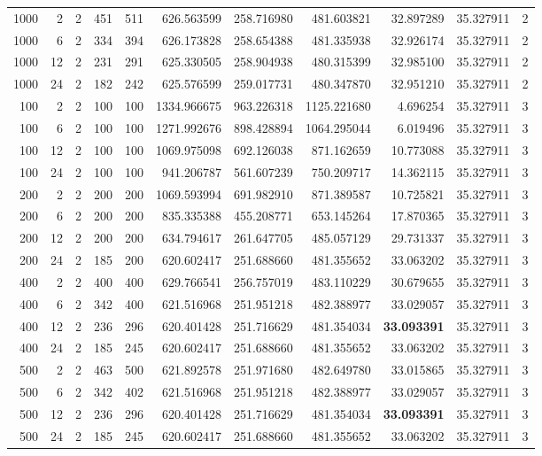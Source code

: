 \begin{table}
\begin{tabular}{rrrrrrrrrrr}
1000 & 2 & 2 & 451 & 511 & 626.563599 & 258.716980 & 481.603821 & 32.897289 & 35.327911 & 2 \\
1000 & 6 & 2 & 334 & 394 & 626.173828 & 258.654388 & 481.335938 & 32.926174 & 35.327911 & 2 \\
1000 & 12 & 2 & 231 & 291 & 625.330505 & 258.904938 & 480.315399 & 32.985100 & 35.327911 & 2 \\
1000 & 24 & 2 & 182 & 242 & 625.576599 & 259.017731 & 480.347870 & 32.951210 & 35.327911 & 2 \\
100 & 2 & 2 & 100 & 100 & 1334.966675 & 963.226318 & 1125.221680 & 4.696254 & 35.327911 & 3 \\
100 & 6 & 2 & 100 & 100 & 1271.992676 & 898.428894 & 1064.295044 & 6.019496 & 35.327911 & 3 \\
100 & 12 & 2 & 100 & 100 & 1069.975098 & 692.126038 & 871.162659 & 10.773088 & 35.327911 & 3 \\
100 & 24 & 2 & 100 & 100 & 941.206787 & 561.607239 & 750.209717 & 14.362115 & 35.327911 & 3 \\
200 & 2 & 2 & 200 & 200 & 1069.593994 & 691.982910 & 871.389587 & 10.725821 & 35.327911 & 3 \\
200 & 6 & 2 & 200 & 200 & 835.335388 & 455.208771 & 653.145264 & 17.870365 & 35.327911 & 3 \\
200 & 12 & 2 & 200 & 200 & 634.794617 & 261.647705 & 485.057129 & 29.731337 & 35.327911 & 3 \\
200 & 24 & 2 & 185 & 200 & 620.602417 & 251.688660 & 481.355652 & 33.063202 & 35.327911 & 3 \\
400 & 2 & 2 & 400 & 400 & 629.766541 & 256.757019 & 483.110229 & 30.679655 & 35.327911 & 3 \\
400 & 6 & 2 & 342 & 400 & 621.516968 & 251.951218 & 482.388977 & 33.029057 & 35.327911 & 3 \\
400 & 12 & 2 & 236 & 296 & 620.401428 & 251.716629 & 481.354034 & \textbf{33.093391} & 35.327911 & 3 \\
400 & 24 & 2 & 185 & 245 & 620.602417 & 251.688660 & 481.355652 & 33.063202 & 35.327911 & 3 \\
500 & 2 & 2 & 463 & 500 & 621.892578 & 251.971680 & 482.649780 & 33.015865 & 35.327911 & 3 \\
500 & 6 & 2 & 342 & 402 & 621.516968 & 251.951218 & 482.388977 & 33.029057 & 35.327911 & 3 \\
500 & 12 & 2 & 236 & 296 & 620.401428 & 251.716629 & 481.354034 & \textbf{33.093391} & 35.327911 & 3 \\
500 & 24 & 2 & 185 & 245 & 620.602417 & 251.688660 & 481.355652 & 33.063202 & 35.327911 & 3 \\

\end{tabular}
\end{table}
